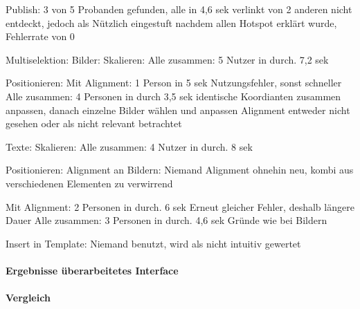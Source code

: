 Publish: 3 von 5 Probanden gefunden, alle in 4,6 sek verlinkt
von 2 anderen nicht entdeckt, jedoch als Nützlich eingestuft
nachdem allen Hotspot erklärt wurde, Fehlerrate von 0

Multiselektion:
Bilder:
	Skalieren:
		Alle zusammen: 5 Nutzer in durch. 7,2 sek

	Positionieren:
		Mit Alignment: 1 Person in 5 sek
			Nutzungsfehler, sonst schneller
		Alle zusammen: 4 Personen in durch 3,5 sek
			identische Koordianten zusammen anpassen, danach einzelne Bilder wählen und anpassen
			Alignment entweder nicht gesehen oder als nicht relevant betrachtet

Texte:
	Skalieren:
		Alle zusammen: 4 Nutzer in durch. 8 sek

	Positionieren:
		Alignment an Bildern: Niemand
			Alignment ohnehin neu, kombi aus verschiedenen Elementen zu verwirrend
		
		Mit Alignment: 2 Personen in durch. 6 sek
			Erneut gleicher Fehler, deshalb längere Dauer
		Alle zusammen: 3 Personen in durch. 4,6 sek
			Gründe wie bei Bildern


Insert in Template: Niemand benutzt, wird als nicht intuitiv gewertet


\paragraph{Ergebnisse überarbeitetes Interface}
\paragraph{Vergleich}
